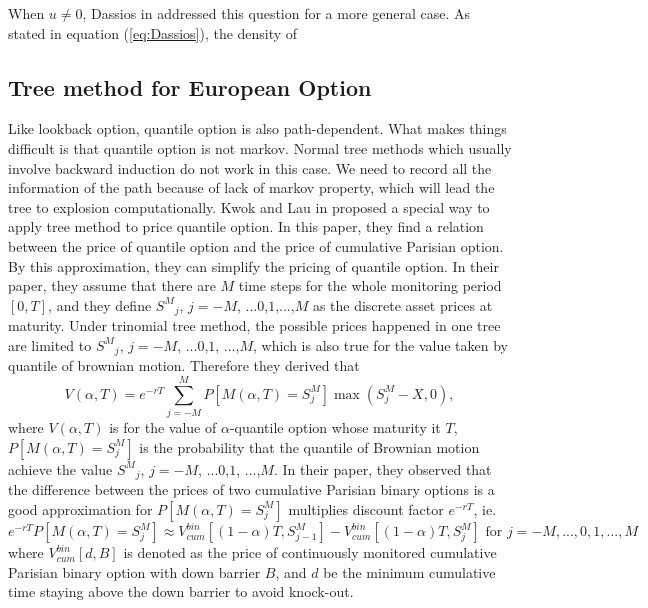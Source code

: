\documentclass[11pt]{book}
\begin{document}
When $u \neq 0$, Dassios  in \cite{Dassios1995} addressed this question for a more general case.  As stated in equation (\ref{eq:Dassios}), the density of


\subsection{Tree method for European Option}
Like lookback option, quantile option is also path-dependent. What makes things difficult is that quantile option is not markov. Normal tree methods which usually involve backward induction do not work in this case. We need to record all the information of the path because of lack of markov property, which will lead the tree to explosion computationally.
Kwok and Lau in \cite{Kwok2001} proposed a special way to apply tree method to price quantile option. In this paper, they find a relation between the price of quantile option and the price of cumulative Parisian option. By this approximation, they can simplify the pricing of quantile option. In their paper, they assume that there are $M$ time steps for the whole monitoring period $[0,T]$, and they define ${S^M}_j$, $j = - M$, ...$0$,$1$,...,$M$ as the discrete asset prices at maturity. Under trinomial tree method, the possible prices happened in one tree are limited to ${S^M}_j$,  $j = - M$, ...$0$,$1$, ...,$M$, which is also true for the value taken by quantile of brownian motion. Therefore they derived that
\begin{equation}\label{eq:kowk1}
V(\alpha, T) = e^{-rT} \sum^{M}_{j=-M}P[M(\alpha,T)=S^{M}_{j}]\max(S^{M}_{j}-X,0),
\end{equation}
where $V(\alpha,T)$ is for the value of $\alpha$-quantile option whose maturity it $T$, $P[M(\alpha,T)=S^{M}_{j}]$ is the probability that the quantile of Brownian motion achieve the value ${S^M}_j$,  $j = - M$, ...$0$,$1$, ...,$M$. In their paper, they observed that the difference between the prices of two cumulative Parisian binary options is a good approximation for $P[M(\alpha,T)=S^{M}_{j}]$ multiplies discount factor $e^{-rT}$, ie.
\begin{equation}\label{eq:kowk2}
e^{-rT}P[M(\alpha,T)=S^{M}_{j}] \approx V^{bin}_{cum}[(1-\alpha)T, S^{M}_{j-1}]-V_{cum}^{bin}[(1-\alpha)T, S_{j}^{M}]
\text{ for }j=-M, ... , 0, 1, ... , M
\end{equation}
where $V^{bin}_{cum}[d,B]$ is denoted as the price of continuously monitored cumulative Parisian binary option with down barrier $B$, and $d$ be the minimum cumulative time staying above the down barrier to avoid knock-out.
\end{document}
